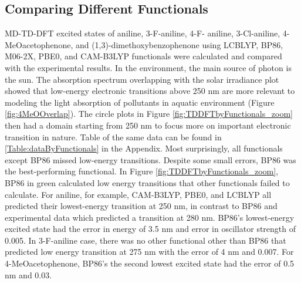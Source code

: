 \documentclass[
journal=jpcbfk, %
manuscript=article]{achemso}
\begin{document}
	
	\subsection{Comparing Different Functionals} \label{step5}
	MD-TD-DFT excited states of aniline, 3-F-aniline, 4-F- aniline, 3-Cl-aniline, 4-MeOacetophenone, and (1,3)-dimethoxybenzophenone using LCBLYP, BP86, M06-2X, PBE0, and CAM-B3LYP functionals were calculated and compared with the experimental results. In the environment, the main source of photon is the sun. The absorption spectrum overlapping with the solar irradiance plot showed that low-energy electronic transitions above 250 nm are more relevant to modeling the light absorption of pollutants in aquatic environment (Figure \ref{fig:4MeOOverlap}). The circle plots in Figure \ref{fig:TDDFTbyFunctionals_zoom} then had a domain starting from 250 nm to focus more on important electronic transition in nature. Table of the same data can be found in \ref{Table:dataByFunctionals} in the Appendix. Most surprisingly, all functionals except BP86 missed low-energy transitions. Despite some small errors, BP86 was the best-performing functional. In Figure \ref{fig:TDDFTbyFunctionals_zoom}, BP86 in green calculated low energy transitions that other functionals failed to calculate. For aniline, for example, CAM-B3LYP, PBE0, and LCBLYP all predicted their lowest-energy transition at 250 nm, in contrast to BP86 and experimental data which predicted a transition at 280 nm. BP86's lowest-energy excited state had the error in energy of 3.5 nm and error in oscillator strength of 0.005. In 3-F-aniline case, there was no other functional other than BP86 that predicted low energy transition at 275 nm with the error of 4 nm and 0.007. For 4-MeOacetophenone, BP86's the second lowest excited state had the error of 0.5 nm and 0.03.
\end{document}
